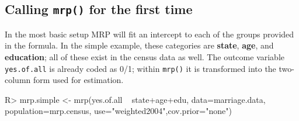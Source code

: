 \documentclass[11pt]{article} %
\begin{document}
\begin{Schunk}
\end{Schunk}

\subsection{Calling \texttt{mrp()} for the first time}
\label{sec:calling-mrp-first}

In the most basic setup MRP will fit an intercept to each of the groups provided in the formula. In the simple example, these categories are \textbf{state}, \textbf{age}, and \textbf{education}; all of these exist in the census data as well. The outcome variable \texttt{yes.of.all} is already coded as 0/1; within \texttt{mrp()} it is transformed into the two-column form used for estimation.

\begin{Schunk}
\begin{Sinput}
R> mrp.simple <- mrp(yes.of.all ~ state+age+edu, 
                     data=marriage.data,
                     population=mrp.census,
                     use="weighted2004",cov.prior="none")
\end{Sinput}
\end{Schunk}
\end{document}
